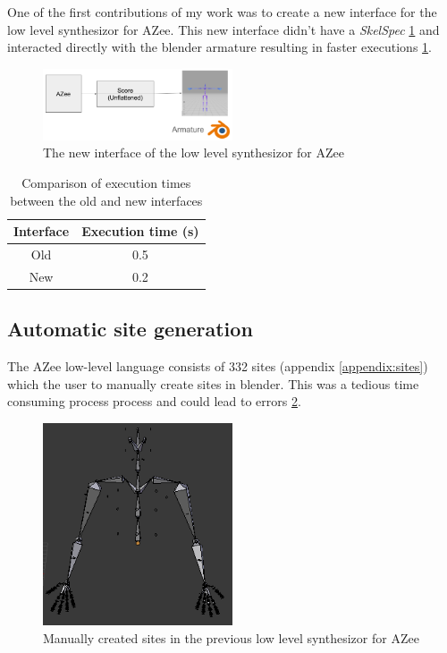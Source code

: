 \documentclass[../../main.tex]{subfiles}
\begin{document}
One of the first contributions of my work was to create a new interface for the low level synthesizor for AZee. This new interface didn't have a \emph{SkelSpec} \ref{fig:new_interface} and interacted directly with the blender armature resulting in faster executions \ref{tab:faster_executions}.

\begin{figure}[h]
    \centering
    \includegraphics[width=0.5\textwidth]{chapters/rigging_layers/images/new_interface.png}
    \caption{The new interface of the low level synthesizor for AZee}
    \label{fig:new_interface}
\end{figure}

\begin{table}
    \centering
    \begin{tabular}{|c|c|}
        \hline
        \textbf{Interface} & \textbf{Execution time (s)} \\
        \hline
        Old & 0.5 \\
        New & 0.2 \\
        \hline
    \end{tabular}
    \caption{Comparison of execution times between the old and new interfaces}
    \label{tab:faster_executions}
\end{table}

\subsection{Automatic site generation}

The AZee low-level language consists of 332 sites (appendix \ref{appendix:sites}) which the user to manually create sites in blender. This was a tedious time consuming process process and could lead to errors \ref{fig:prev_sites}.

\begin{figure}[h]
    \centering
    \includegraphics[width=0.5\textwidth]{chapters/rigging_layers/images/prev_sites.png}
    \caption{Manually created sites in the previous low level synthesizor for AZee}
    \label{fig:prev_sites}
\end{figure}
\end{document}
